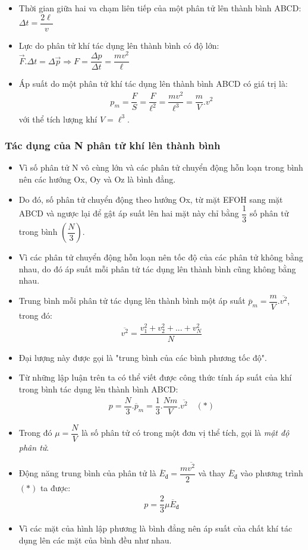 \begin{itemize}
	\item Thời gian giữa hai va chạm liên tiếp của một phân tử lên thành bình ABCD: $\Delta t=\dfrac{2\ell}{v}$

	\item Lực do phân tử khí tác dụng lên thành bình có độ lớn: $\vec F.\Delta t=\Delta \vec p \Rightarrow F=\dfrac{\Delta p}{\Delta t}=\dfrac{mv^2}{\ell}$
	\item Áp suất do một phân tử khí tác dụng lên thành bình ABCD có giá trị là:
	\begin{align*}
	 p_m=\dfrac{F}{S}=\dfrac{F}{\ell^2}=\dfrac{mv^2}{\ell^3}=\dfrac{m}{V}.v^2
	 \end{align*}
	 với thể tích lượng khí $V=\ell^3$.
\end{itemize}
\subsubsection{Tác dụng của N phân tử khí lên thành bình}
\begin{itemize}
	\item Vì số phân tử N vô cùng lớn và các phân tử chuyển động hỗn loạn trong bình nên các hướng Ox, Oy và Oz là bình đẳng.
	\item Do đó, số phân tử chuyển động theo hướng Ox, từ mặt EFOH sang mặt ABCD và ngược lại để gật áp suất lên hai mặt này chỉ bằng $\dfrac{1}{3}$ số phân tử trong bình $\left(\dfrac{N}{3}\right)$.
	\item Vì các phân tử chuyển động hỗn loạn nên tốc độ của các phân tử không bằng nhau, do đó áp suất mỗi phân tử tác dụng lên thành bình cũng không bằng nhau.
	\item Trung bình mỗi phân tử tác dụng lên thành bình một áp suất $\overline{p}_m=\dfrac{m}{V}.\overline{v^2}$, trong đó: 
	\begin{align*}
		\overline{v^2}=\dfrac{v_1^2+v_2^2+...+v_N^2}{N}
	\end{align*}
	\item Đại lượng này được gọi là "trung bình của các bình phương tốc độ".
	\item Từ những lập luận trên ta có thể viết được công thức tính áp suất của khí trong bình tác dụng lên thành bình ABCD: 
	\begin{align*}
		p=\dfrac{N}{3}.\overline{p}_m=\dfrac{1}{3}.\dfrac{Nm}{V}.\overline{v^2}\quad (*)
	\end{align*}
	\item Trong đó $\mu= \dfrac{N}{V}$ là số phân tử có trong một đơn vị thể tích, gọi là \textit{mật độ phân tử}.
	\item Động năng trung bình của phân tử là $\overline{E}_{\text{đ}}=\dfrac{m\overline{v^2}}{2}$ và thay $\overline{E}_{\text{đ}}$ vào phương trình $(*)$ ta được: 
	\begin{align*}
		p=\dfrac{2}{3}\mu \overline{E}_{\text{đ}}
	\end{align*}
	\item Vì các mặt của hình lập phương là bình đẳng nên áp suất của chất khí tác dụng lên các mặt của bình đều như nhau.
\end{itemize}
